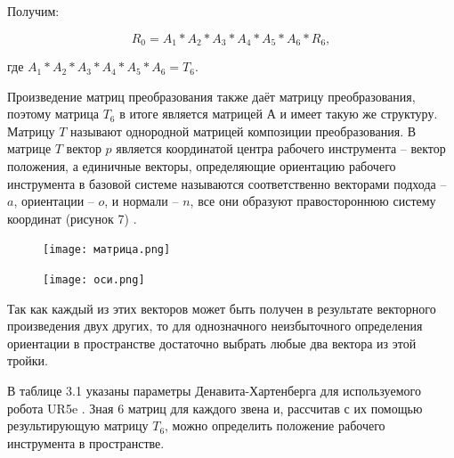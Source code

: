 Получим:

\begin{equation}
R_0=A_1*A_2*A_3*A_4*A_5*A_6*R_6,
\end{equation}

где $A_1*A_2*A_3*A_4*A_5*A_6 = T_{6}$.

Произведение матриц преобразования также даёт матрицу преобразования, поэтому матрица $T_6$ в итоге является матрицей А и имеет такую же структуру. Матрицу $T$ называют однородной матрицей композиции преобразования. В матрице $T$ вектор $p$ является координатой центра рабочего инструмента – вектор положения, а единичные векторы, определяющие ориентацию рабочего инструмента в базовой системе называются соответственно векторами подхода – $a$, ориентации – $o$, и нормали – $n$, все они образуют правостороннюю систему координат (рисунок 7) \cite{litlink12}.

\begin{figure}[!h]
\begin{center}
\begin{minipage}[h]{0.4\linewidth}
\texttt{[image: матрица.png]}
\end{minipage}
\begin{minipage}[h]{0.4\linewidth}
\texttt{[image: оси.png]}
\end{minipage}
\caption{\centering {}}
\label{risB}
\end{center}
\end{figure}

Так как каждый из этих векторов может быть получен в результате векторного произведения двух других, то для однозначного неизбыточного определения ориентации в пространстве достаточно выбрать любые два вектора из этой тройки.

В таблице 3.1 указаны параметры Денавита-Хартенберга для используемого робота UR5e \cite{litlink13}. Зная 6 матриц для каждого звена и, рассчитав с их помощью результирующую матрицу $T_{6}$, можно определить положение рабочего инструмента в пространстве.

